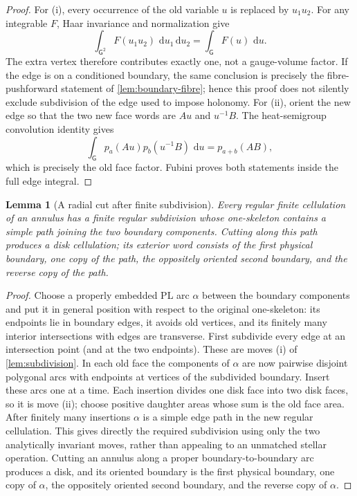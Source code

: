 \documentclass[11pt]{article}
\newtheorem{lemma}[theorem]{Lemma}
\theoremstyle{remark}
\newcommand{\G}{\mathsf G}
\newcommand{\dd}{\,\mathrm d}
\begin{document}
\begin{proof}
For (i), every occurrence of the old variable $u$ is replaced by $u_1u_2$.
For any integrable $F$, Haar invariance and normalization give
\[
 \int_{\G^2}F(u_1u_2)\,\dd u_1\dd u_2=\int_\G F(u)\,\dd u.
\]
The extra vertex therefore contributes exactly one, not a gauge-volume factor.
If the edge is on a conditioned boundary, the same conclusion is precisely
the fibre-pushforward statement of \cref{lem:boundary-fibre}; hence this proof
does not silently exclude subdivision of the edge used to impose holonomy.
For (ii), orient the new edge so that the two new face words are $Au$ and
$u^{-1}B$.  The heat-semigroup convolution identity gives
\[
 \int_\G p_a(Au)p_b(u^{-1}B)\,\dd u=p_{a+b}(AB),
\]
which is precisely the old face factor.  Fubini proves both statements inside
the full edge integral.
\end{proof}

\begin{lemma}[A radial cut after finite subdivision]\label{lem:topological-cut}
Every regular finite cellulation of an annulus has a finite regular subdivision
whose one-skeleton contains a simple path joining the two boundary components.
Cutting along this path produces a disk cellulation; its exterior word consists
of the first physical boundary, one copy of the path, the oppositely oriented
second boundary, and the reverse copy of the path.
\end{lemma}

\begin{proof}
Choose a properly embedded PL arc $\alpha$ between the boundary components and
put it in general position with respect to the original one-skeleton: its
endpoints lie in boundary edges, it avoids old vertices, and its finitely many
interior intersections with edges are transverse.  First subdivide every edge
at an intersection point (and at the two endpoints).  These are moves (i) of
\cref{lem:subdivision}.  In each old face the components of $\alpha$ are now
pairwise disjoint polygonal arcs with endpoints at vertices of the subdivided
boundary.  Insert these arcs one at a time.  Each insertion divides one disk
face into two disk faces, so it is move (ii); choose positive daughter areas
whose sum is the old face area.  After finitely many insertions $\alpha$ is a
simple edge path in the new regular cellulation.  This gives directly the
required subdivision using only the two analytically invariant moves, rather
than appealing to an unmatched stellar operation.  Cutting an annulus along a
proper boundary-to-boundary arc produces a disk, and its oriented boundary is
the first physical boundary, one copy of $\alpha$, the oppositely oriented
second boundary, and the reverse copy of $\alpha$.
\end{proof}
\end{document}
